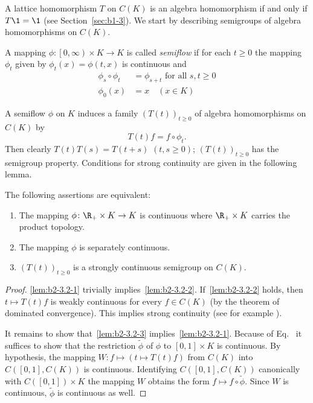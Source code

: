 A lattice homomorphism $T$ on $C(K)$ is an algebra homomorphism if and only if\/ $T \1 = \1$ (see Section~\ref{sec:b1-3}).
We start by describing semigroups of algebra homomor\-phisms on $C(K)$.
\begin{definition}\label{def:b2-3.1}
A mapping $\phi \colon \left[0,\infty\right) \times K \to K$ is called \emph{semiflow} if for each $t \geq 0$ the mapping $\phi_{t}$ given by $\phi_{t}(x) = \phi(t,x)$ is continuous and
\begin{align}
\phi_{s} \circ \phi_{t} &= \phi_{s+t} \text{ for all } s,t \geq 0 \label{eq:b2-3.1} \\
\phi_{0}(x) &= x \quad (x \in K) \label{eq:b2-3.2}
\end{align}
\end{definition}
A semiflow $\phi$ on $K$ induces a family $(T(t))_{t \geq 0}$ of algebra homomorphisms on $C(K)$ by
\begin{equation}\label{eq:b2-3.3}
T(t)f = f \circ \phi_{t}.
\end{equation}
Then clearly $T(t)T(s) = T(t+s)$ $(t,s\geq 0)$; \ie  $(T(t))_{t \geq 0}$ has the
semigroup property.
Conditions for strong continuity are given in the following lemma.
\begin{lemma}\label{lem:b2-3.2}
The following assertions are equivalent:
\begin{enumerate}[\upshape (a)]
\item \label{lem:b2-3.2-1}
The mapping $\phi \colon \R_{+} \times K \to K$ is continuous where $\R_{+} \times K$ carries the product topology.
\item \label{lem:b2-3.2-2}
The mapping $\phi$ is separately continuous.
\item \label{lem:b2-3.2-3}
$(T(t))_{t \geq 0}$ is a strongly continuous semigroup on $C(K)$.
\end{enumerate}
\end{lemma}
\begin{proof}
\ref{lem:b2-3.2-1} trivially implies~\ref{lem:b2-3.2-2}.
If~\ref{lem:b2-3.2-2} holds, then $t \mapsto T(t)f$ is weakly continuous for every $f \in C(K)$ (by the theorem of dominated convergence).
This implies strong continuity (see for example \textcite[Proposition 1.23]{davies:1980}).

It remains to show that~\ref{lem:b2-3.2-3} implies~\ref{lem:b2-3.2-1}.
Because of Eq.~ it suffices to show that the restriction $\widetilde{\phi}$ of\/ $\phi$ to $[0,1] \times K$ is continuous.
By hypothesis, the mapping $W \colon f \mapsto (t \mapsto T(t)f)$ from $C(K)$ into $C([0,1],C(K))$ is continuous.
Identifying $C([0,1],C(K))$ canonically with $C([0,1]) \times K$ the mapping $W$ obtains the form $f \mapsto f \circ \widetilde{\phi}$.
Since $W$ is continuous, $\widetilde{\phi}$ is continuous as well.
\end{proof}
